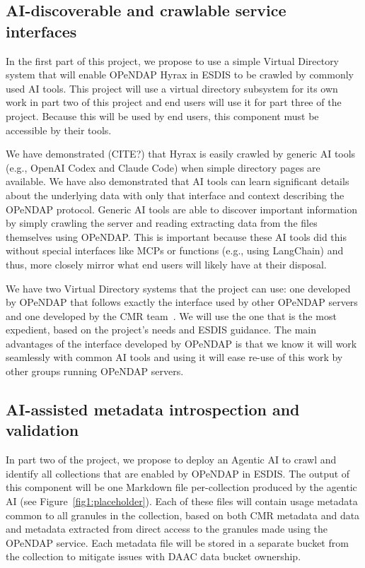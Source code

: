 \documentclass[11pt]{article}
\begin{document}
\subsection{AI-discoverable and crawlable service interfaces}
\label{section-2.1}

In the first part of this project, we propose to use a simple Virtual Directory system that will enable \ac{OPeNDAP} Hyrax in \ac{ESDIS} to be crawled by commonly used \ac{AI} tools. This project will use a virtual directory subsystem for its own work in part two of this project and end users will use it for part three of the project. Because this will be used by end users, this component must be accessible by their tools. 

We have demonstrated (CITE?) that Hyrax is easily crawled by generic \ac{AI} tools (e.g., OpenAI Codex and Claude Code) when simple directory pages are available. We have also demonstrated that \ac{AI} tools can learn significant details about the underlying data with only that interface and context describing the \ac{OPeNDAP} protocol. Generic \ac{AI} tools are able to discover important information by simply crawling the server and reading extracting data from the files themselves using \ac{OPeNDAP}. This is important because these \ac{AI} tools did this without special interfaces like \acp{MCP} or functions (e.g., using LangChain) and thus, more closely mirror what end users will likely have at their disposal.

We have two Virtual Directory systems that the project can use: one developed by \ac{OPeNDAP} that follows exactly the interface used by other \ac{OPeNDAP} servers and one developed by the \ac{CMR} team~\cite{cmrvdi}. We will use the one that is the most expedient, based on the project's needs and \ac{ESDIS} guidance. The main advantages of the interface developed by \ac{OPeNDAP} is that we know it will work seamlessly with common \ac{AI} tools and using it will ease re-use of this work by other groups running \ac{OPeNDAP} servers.


\subsection{AI-assisted metadata introspection and validation}
\label{section-2.2}
In part two of the project, we propose to deploy an Agentic \ac{AI} to crawl and identify all collections that are enabled by \ac{OPeNDAP} in \ac{ESDIS}. The output of this component will be one Markdown file per-collection produced by the agentic \ac{AI} (see Figure~\ref{fig1:placeholder}). Each of these files will contain usage metadata common to all granules in the collection, based on both \ac{CMR} metadata and data and metadata extracted from direct access to the granules made using the \ac{OPeNDAP} service. Each metadata file will be stored in a separate bucket from the collection to mitigate issues with \ac{DAAC} data bucket ownership.
\end{document}
